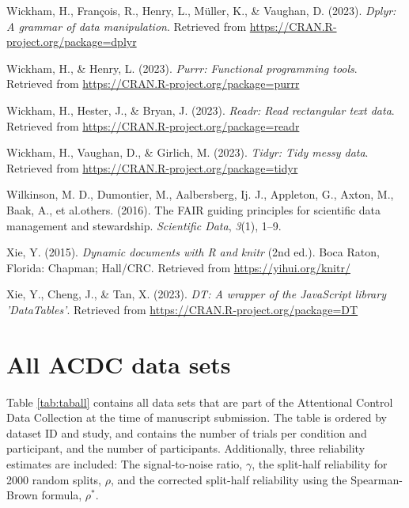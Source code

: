 \documentclass[
  man,floatsintext]{apa6}
\newlength{\cslhangindent}
\newlength{\cslentryspacingunit} %
\newenvironment{CSLReferences}[2] %
 {%
  \setlength{\parindent}{0pt}
  \ifodd #1
  \let\oldpar\par
  \def\par{\hangindent=\cslhangindent\oldpar}
  \fi
  \setlength{\parskip}{#2\cslentryspacingunit}
 }%
 {}
\begin{document}
\begin{CSLReferences}{1}{0}
\leavevmode{}%
Wickham, H., François, R., Henry, L., Müller, K., \& Vaughan, D. (2023). \emph{Dplyr: A grammar of data manipulation}. Retrieved from \url{https://CRAN.R-project.org/package=dplyr}

\leavevmode{}%
Wickham, H., \& Henry, L. (2023). \emph{Purrr: Functional programming tools}. Retrieved from \url{https://CRAN.R-project.org/package=purrr}

\leavevmode{}%
Wickham, H., Hester, J., \& Bryan, J. (2023). \emph{Readr: Read rectangular text data}. Retrieved from \url{https://CRAN.R-project.org/package=readr}

\leavevmode{}%
Wickham, H., Vaughan, D., \& Girlich, M. (2023). \emph{Tidyr: Tidy messy data}. Retrieved from \url{https://CRAN.R-project.org/package=tidyr}

\leavevmode{}%
Wilkinson, M. D., Dumontier, M., Aalbersberg, Ij. J., Appleton, G., Axton, M., Baak, A., et al.others. (2016). The FAIR guiding principles for scientific data management and stewardship. \emph{Scientific Data}, \emph{3}(1), 1--9.

\leavevmode{}%
Xie, Y. (2015). \emph{Dynamic documents with {R} and knitr} (2nd ed.). Boca Raton, Florida: Chapman; Hall/CRC. Retrieved from \url{https://yihui.org/knitr/}

\leavevmode{}%
Xie, Y., Cheng, J., \& Tan, X. (2023). \emph{DT: A wrapper of the JavaScript library 'DataTables'}. Retrieved from \url{https://CRAN.R-project.org/package=DT}

\end{CSLReferences}

\newpage

\hypertarget{appendix-appendix}{%
\appendix}


\hypertarget{all-acdc-data-sets}{%
\section{All ACDC data sets}\label{all-acdc-data-sets}}

Table \ref{tab:taball} contains all data sets that are part of the Attentional Control Data Collection at the time of manuscript submission. The table is ordered by dataset ID and study, and contains the number of trials per condition and participant, and the number of participants. Additionally, three reliability estimates are included: The signal-to-noise ratio, \(\gamma\), the split-half reliability for 2000 random splits, \(\rho\), and the corrected split-half reliability using the Spearman-Brown formula, \(\rho^*\).
\end{document}

